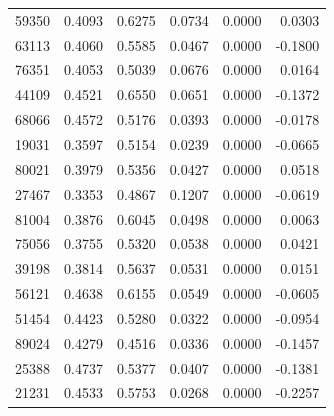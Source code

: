 \begin{tabular}{lrrrrr}
59350 & 0.4093 & 0.6275 & 0.0734 & 0.0000 & 0.0303 \\
63113 & 0.4060 & 0.5585 & 0.0467 & 0.0000 & -0.1800 \\
76351 & 0.4053 & 0.5039 & 0.0676 & 0.0000 & 0.0164 \\
44109 & 0.4521 & 0.6550 & 0.0651 & 0.0000 & -0.1372 \\
68066 & 0.4572 & 0.5176 & 0.0393 & 0.0000 & -0.0178 \\
19031 & 0.3597 & 0.5154 & 0.0239 & 0.0000 & -0.0665 \\
80021 & 0.3979 & 0.5356 & 0.0427 & 0.0000 & 0.0518 \\
27467 & 0.3353 & 0.4867 & 0.1207 & 0.0000 & -0.0619 \\
81004 & 0.3876 & 0.6045 & 0.0498 & 0.0000 & 0.0063 \\
75056 & 0.3755 & 0.5320 & 0.0538 & 0.0000 & 0.0421 \\
39198 & 0.3814 & 0.5637 & 0.0531 & 0.0000 & 0.0151 \\
56121 & 0.4638 & 0.6155 & 0.0549 & 0.0000 & -0.0605 \\
51454 & 0.4423 & 0.5280 & 0.0322 & 0.0000 & -0.0954 \\
89024 & 0.4279 & 0.4516 & 0.0336 & 0.0000 & -0.1457 \\
25388 & 0.4737 & 0.5377 & 0.0407 & 0.0000 & -0.1381 \\
21231 & 0.4533 & 0.5753 & 0.0268 & 0.0000 & -0.2257 \\
\bottomrule
\end{tabular}
